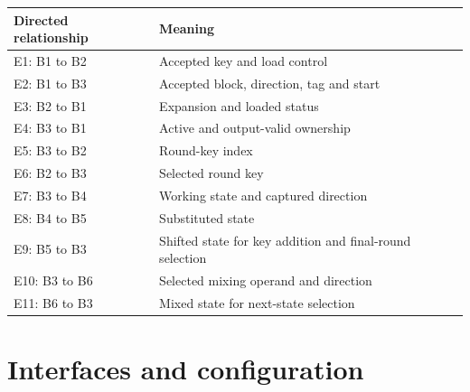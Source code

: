 \documentclass[11pt,a4paper]{article}
\begin{document}
{\small\renewcommand{\arraystretch}{1.18}\begin{longtable}{@{}L{0.24\textwidth}|L{0.7\textwidth}@{}}\toprule

\textbf{Directed relationship} & \textbf{Meaning}\\\midrule\endhead

E1: B1 to B2 & Accepted key and load control\\[2pt]\hline

E2: B1 to B3 & Accepted block,\allowbreak{} direction,\allowbreak{} tag and start\\[2pt]\hline

E3: B2 to B1 & Expansion and loaded status\\[2pt]\hline

E4: B3 to B1 & Active and output-valid ownership\\[2pt]\hline

E5: B3 to B2 & Round-key index\\[2pt]\hline

E6: B2 to B3 & Selected round key\\[2pt]\hline

E7: B3 to B4 & Working state and captured direction\\[2pt]\hline

E8: B4 to B5 & Substituted state\\[2pt]\hline

E9: B5 to B3 & Shifted state for key addition and final-round selection\\[2pt]\hline

E10: B3 to B6 & Selected mixing operand and direction\\[2pt]\hline

E11: B6 to B3 & Mixed state for next-state selection\\[2pt]\hline

\bottomrule\end{longtable}}

\section{Interfaces and configuration}
\end{document}
